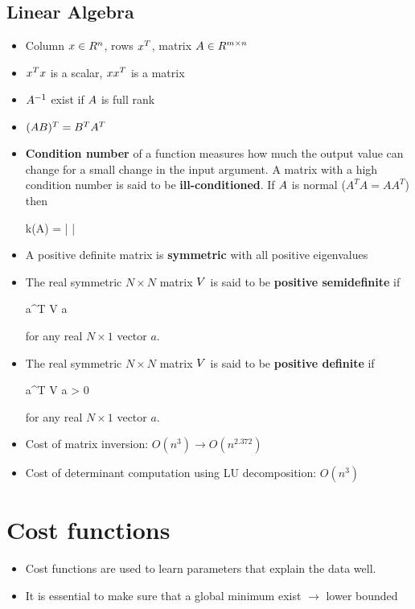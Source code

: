 \subsection{Linear Algebra}
\begin{itemize}
\item Column $\*x \in R^n$, rows $\*x^T$, matrix $\*A \in R^{m \times n}$

\item $\*x^T \*x$ is a scalar, $\*x \*x^T$ is a matrix

\item $\*A^{-1}$ exist if $\*A$ is full rank

\item $(\*A \*B)^T = \*B^T \*A^T$

\item \textbf{Condition number} of a function measures how much the output value can change for a small change in the input argument. A matrix with a high condition number is said to be \textbf{ill-conditioned}. If $\*A$ is normal ($A^T A = A A^T$) then
\begin{myalign*}
    k(\*A) = 
    \left|
    \right|
\end{myalign*}

\item A positive definite matrix is \textbf{symmetric} with all positive eigenvalues
\item The real symmetric $N \times N$ matrix $\*V$ is said to be \textbf{positive semidefinite} if 
\begin{myalign*}
    \*a^T \*V \*a 
\end{myalign*}
for any real $N \times 1$ vector $a$.
\item The real symmetric $N \times N$ matrix $\*V$ is said to be \textbf{positive definite} if 
\begin{myalign*}
    \*a^T \*V \*a > 0
\end{myalign*}
for any real $N \times 1$ vector $a$.
\item Cost of matrix inversion: $O(n^3) \rightarrow O(n^{2.372})$
\item Cost of determinant computation using LU decomposition: $O(n^3)$

\end{itemize}


\section{Cost functions}
\begin{itemize}
    \item Cost functions are used to learn parameters that explain the data well.
    \item It is essential to make sure that a global minimum exist $\rightarrow$ lower bounded
\end{itemize}


